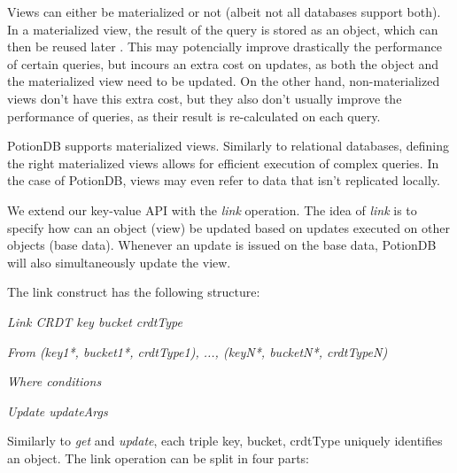 \documentclass{vldb}
\newcommand{\emphvspace}{0.5\baselineskip}
\newcommand{\firstblockemph}[1]{\vspace{\emphvspace}\hspace{2em}\emph{#1}}
\newcommand{\middleblockemph}[1]{\hspace{2em}\emph{#1}}
\newcommand{\lastblockemph}[1]{\hspace{2em}\emph{#1}\vspace{\emphvspace}}
\begin{document}
Views can either be materialized or not (albeit not all databases support both). %
In a materialized view, the result of the query is stored as an object, which can then be reused later \cite{???}.
This may potencially improve drastically the performance of certain queries, but incours an extra cost on updates, as both the object and the materialized view need to be updated.
On the other hand, non-materialized views don't have this extra cost, but they also don't usually improve the performance of queries, as their result is re-calculated on each query.

PotionDB supports materialized views.
Similarly to relational databases, defining the right materialized views allows for efficient execution of complex queries.
In the case of PotionDB, views may even refer to data that isn't replicated locally.

We extend our key-value API with the \emph{link} operation.
The idea of \emph{link} is to specify how can an object (view) be updated based on updates executed on other objects (base data).
Whenever an update is issued on the base data, PotionDB will also simultaneously update the view.

The link construct has the following structure:

\firstblockemph{Link CRDT key bucket crdtType}

\middleblockemph{From (key1*, bucket1*, crdtType1), ..., (keyN*, bucketN*, crdtTypeN)}

\middleblockemph{Where conditions}

\lastblockemph{Update updateArgs}

Similarly to \emph{get} and \emph{update}, each triple key, bucket, crdtType uniquely identifies an object.
The link operation can be split in four parts:
\end{document}
